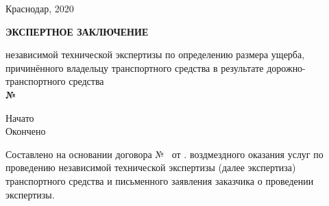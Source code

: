\begin{flushright}
% 
	 \hfill	Краснодар, 2020    \\[8mm]
\end{flushright}
\begin{center}
	\LARGE\textbf{ЭКСПЕРТНОЕ ЗАКЛЮЧЕНИЕ}
	\bigskip\\[0mm]
\end{center}
\par
\vspace{-6mm}
\noindent независимой технической экспертизы по определению размера ущерба, причинённого владельцу транспортного средства в результате дорожно-транспортного средства\\[2mm]
\noindent \textbf{№ \NomerDoc}\hfill           \textbf{\dataend}\\%

\noindent\parbox[l][16mm]{16.5cm}
{\def\hrf#1{\hbox to#1{\hrulefill}}
	\noindent Начато\hfill            \datastart\\%
	Окончено\hfill                \dataend
}
\relax

%
%
%
\vspace{4mm}
Составлено на основании	договора № \NomerDoc\, от \dog. воздмездного оказания услуг по проведению независимой технической экспертизы (далее экспертиза)  транспортного средства и письменного заявления заказчика о проведении экспертизы. 

